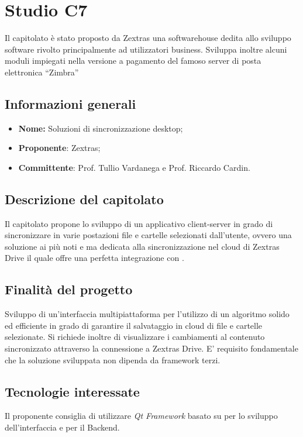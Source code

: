 \section{Studio C7} \label{_c7}

Il capitolato è stato proposto da Zextras una softwarehouse dedita allo sviluppo software rivolto principalmente ad utilizzatori business.
Sviluppa inoltre alcuni moduli impiegati nella versione a pagamento del famoso server di posta elettronica “Zimbra”

\subsection{Informazioni generali}
\begin{itemize}
	\item \textbf{Nome:} Soluzioni di sincronizzazione desktop;
	\item \textbf{Proponente}: Zextras;
	\item \textbf{Committente}: Prof. Tullio Vardanega e Prof. Riccardo Cardin.
\end{itemize}

\subsection{Descrizione del capitolato}
Il capitolato propone lo sviluppo di un applicativo client-server in grado di sincronizzare in varie postazioni file e cartelle selezionati dall’utente, ovvero una soluzione ai più noti \textit{} e \textit{} ma dedicata alla sincronizzazione nel cloud di Zextras Drive il quale offre una perfetta integrazione con \textit{}.

\subsection{Finalità del progetto}
Sviluppo di un’interfaccia multipiattaforma per l’utilizzo di un algoritmo solido ed efficiente in grado di garantire il salvataggio in cloud di file e cartelle selezionate.
Si richiede inoltre di visualizzare i cambiamenti al contenuto sincronizzato attraverso la connessione a Zextras Drive. E’ requisito fondamentale che la soluzione sviluppata non dipenda da framework terzi.


\subsection{Tecnologie interessate}
Il proponente consiglia di utilizzare \textit{Qt Framework} basato su  per lo sviluppo dell’interfaccia e \textit{} per il Backend.

